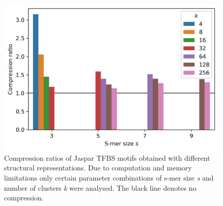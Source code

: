 \documentclass[sigconf]{acmart}
\begin{document}
\begin{figure}[ht]
  \centering
  \includegraphics[width=\linewidth]{smer_fig_compression.png}
  \caption{Compression ratios of Jaspar TFBS motifs obtained with different structural representations. Due to computation and memory limitations only certain parameter combinations of s-mer size \textit{s} and number of clusters \textit{k} were analysed. The black line denotes no compression.}
\end{figure}
\end{document}
